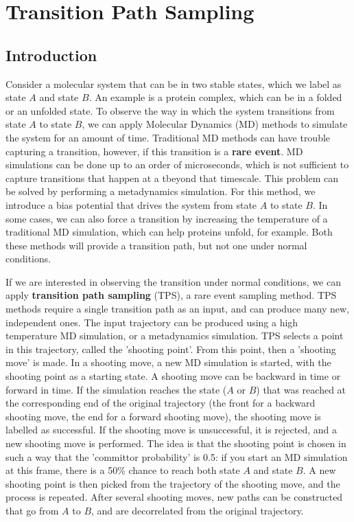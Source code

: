 \documentclass[]{article}
\begin{document}
\section*{Transition Path Sampling}

\subsection*{Introduction}

Consider a molecular system that can be in two stable states, which we label as state $A$ and state $B$. An example is a protein complex, which can be in a folded or an unfolded state. To observe the way in which the system transitions from state $A$ to state $B$, we can apply Molecular Dynamics (MD) methods to simulate the system for an amount of time. Traditional MD methods can have trouble capturing a transition, however, if this transition is a \textbf{rare event}. MD simulations can be done up to an order of microseconds, which is not sufficient to capture transitions that happen at a tbeyond that timescale. This problem can be solved by performing a metadynamics simulation. For this method, we introduce a bias potential that drives the system from state $A$ to state $B$. In some cases, we can also force a transition by increasing the temperature of a traditional MD simulation, which can help proteins unfold, for example. Both these methods will provide a transition path, but not one under normal conditions. 

If we are interested in observing the transition under normal conditions, we can apply \textbf{transition path sampling} (TPS), a rare event sampling method. TPS methods require a single transition path as an input, and can produce many new, independent ones. The input trajectory can be produced using a high temperature MD simulation, or a metadynamics simulation. TPS selects a point in this trajectory, called the 'shooting point'. From this point, then a 'shooting move' is made. In a shooting move, a new MD simulation is started, with the shooting point as a starting state. A shooting move can be backward in time or forward in time. If the simulation reaches the state ($A$ or $B$) that was reached at the corresponding end of the original trajectory (the front for a backward shooting move, the end for a forward shooting move), the shooting move is labelled as successful. If the shooting move is unsuccessful, it is rejected, and a new shooting move is performed. The idea is that the shooting point is chosen in such a way that the 'committor probability' is 0.5: if you start an MD simulation at this frame, there is a 50\% chance to reach both state $A$ and state $B$. A new shooting point is then picked from the trajectory of the shooting move, and the process is repeated. After several shooting moves, new paths can be constructed that go from $A$ to $B$, and are decorrelated from the original trajectory.
\end{document}
